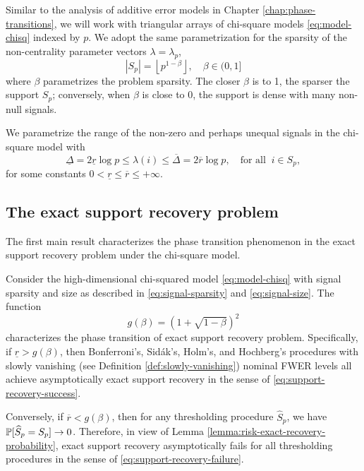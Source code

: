 
Similar to the analysis of additive error models in Chapter \ref{chap:phase-transitions}, we will work with triangular arrays of chi-square models \eqref{eq:model-chisq} indexed by $p$.
We adopt the same parametrization for the sparsity of the non-centrality parameter vectors $\lambda = \lambda_p$,
\begin{equation} \label{eq:signal-sparsity}
    |S_p| = \left\lfloor p^{1-\beta} \right\rfloor, \quad \beta\in(0,1]
\end{equation}
where $\beta$ parametrizes the problem sparsity.
The closer $\beta$ is to 1, the sparser the support $S_p$; conversely, when $\beta$ is close to 0, the support is dense with many non-null signals.

We parametrize the range of the non-zero and perhaps unequal signals in the chi-square model with
\begin{equation} \label{eq:signal-size}
    \underline{\Delta} = 2\underline{r}\log{p}
    \le \lambda(i) \le
    \overline{\Delta} = 2\overline{r}\log{p}, \quad \text{for all}\;\;i\in S_p,
\end{equation}
for some constants $0<\underline{r}\le\overline{r}\le+\infty$.

\subsection{The exact support recovery problem}
\label{subsec:exact-support-recovery-chisq}

The first main result characterizes the phase transition phenomenon in the exact support recovery problem under the chi-square model.

\begin{theorem} \label{thm:chi-squared-exact-boundary}
Consider the high-dimensional chi-squared model \eqref{eq:model-chisq} with signal sparsity and size as described in \eqref{eq:signal-sparsity} and \eqref{eq:signal-size}.
The function 
\begin{equation} \label{eq:exact-boundary-chisquared}
    g(\beta) = \left(1 + \sqrt{1-\beta}\right)^2
\end{equation}
characterizes the phase transition of exact support recovery problem.
Specifically, if $\underline{r} > {{g}}(\beta)$, then Bonferroni's, Sid\'ak's, Holm's, and Hochberg's procedures with slowly vanishing (see Definition \ref{def:slowly-vanishing}) nominal FWER levels all achieve asymptotically exact support recovery in the sense of \eqref{eq:support-recovery-success}. 

Conversely, if $\overline{r} < {{g}}(\beta)$, then for any thresholding procedure $\widehat{S}_p$, we have $\P[\widehat{S}_p=S_p]\to0$.
Therefore, in view of Lemma \ref{lemma:risk-exact-recovery-probability}, exact support recovery asymptotically fails for all thresholding procedures in the sense of \eqref{eq:support-recovery-failure}.
\end{theorem}

